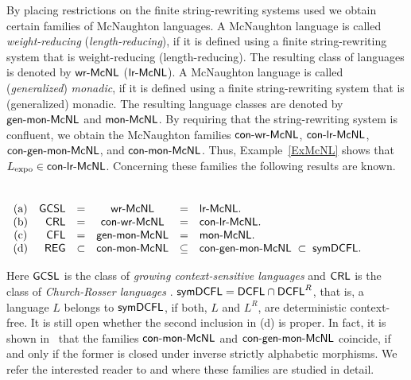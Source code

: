 By placing restrictions on the finite string-rewriting systems used we obtain certain families of McNaughton languages. A McNaughton language is called \emph{weight-reducing} (\emph{length-reducing}), if it is defined using a finite string-rewriting system that is weight-reducing (length-reducing). The resulting class of languages is denoted by \index{$\wrMcNL$}$\wrMcNL$ (\index{$\lrMcNL$}$\lrMcNL$). A McNaughton language is called (\emph{generalized}) \emph{monadic}, if it is defined using a finite string-rewriting system that is (generalized) monadic. The resulting language classes are denoted by \index{$\genmonMcNL$}$\genmonMcNL$ and \index{$\monMcNL$}$\monMcNL$. By requiring that the string-rewriting system is confluent, we obtain the McNaughton families \index{$\conwrMcNL$}$\conwrMcNL$, \index{$\conlrMcNL$}$\conlrMcNL$, \index{$\congenmonMcNL$}$\congenmonMcNL$, and \index{$\conmonMcNL$}$\conmonMcNL$. Thus, Example~\ref{ExMcNL} shows that $L_{\rm expo}\in \textup{\sf con-lr-McNL}$. Concerning these families the following results are known.

\begin{theorem}{\rm \citep{Beaudry2003,Leupold2011}}\label{ThmMcNL}\\[+0.2cm]
$\begin{array}[t]{crcccl}
{\rm (a)} & \textup{\sf GCSL} & = & \textup{\sf wr-McNL} & = & \textup{\sf lr-McNL}.\\
{\rm (b)} & \textup{\sf CRL}  & = & \textup{\sf con-wr-McNL} & = & \textup{\sf con-lr-McNL}.\\
{\rm (c)} & \textup{\sf CFL}  & = & \textup{\sf gen-mon-McNL} & = & \textup{\sf mon-McNL}.\\
{\rm (d)} & \textup{\sf REG}  & \subset & \textup{\sf con-mon-McNL} & \subseteq & \textup{\sf con-gen-mon-McNL}\; \subset\; \textup{\sf symDCFL}.
\end{array}$
\end{theorem}

Here \index{$\GCSL$}$\GCSL$ is the class of \emph{growing context-sensitive languages} \citep{Buntrock19981,Dahlhaus1986} and \index{$\CRL$}$\CRL$ is the class of \emph{Church-Rosser languages} \citep{MNO88}. \index{$\symDCFL$}$\textup{\sf symDCFL} = \textup{\sf DCFL}\cap\textup{\sf DCFL}^R$, that is, a language $L$ belongs to $\symDCFL$, if both, $L$ and $L^R$, are deterministic context-free. It is still open whether the second inclusion in (d) is proper. In fact, it is shown in~\citep{Leupold2011} that the families $\conmonMcNL$ and $\congenmonMcNL$ coincide, if and only if the former is closed under inverse strictly alphabetic morphisms. We refer the interested reader to \citep{Beaudry2003} and \citep{Leupold2011} where these families are studied in detail.

